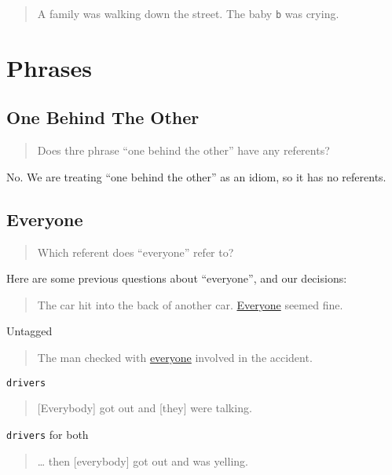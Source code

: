 \documentclass[
]{book}
\begin{document}
\begin{quote}
A family was walking down the street.
The baby \texttt{b} was crying.
\end{quote}

\hypertarget{phrases}{%
\section{Phrases}\label{phrases}}

\hypertarget{one-behind-the-other}{%
\subsection{One Behind The Other}\label{one-behind-the-other}}

\begin{quote}
Does thre phrase ``one behind the other'' have any referents?
\end{quote}

No.
We are treating ``one behind the other'' as an idiom, so it has no referents.

\hypertarget{everyone}{%
\subsection{Everyone}\label{everyone}}

\begin{quote}
Which referent does ``everyone'' refer to?
\end{quote}

Here are some previous questions about ``everyone'', and our decisions:

\begin{quote}
The car hit into the back of another car.
\protect\hyperlink{everyone}{Everyone} seemed fine.
\end{quote}

Untagged

\begin{quote}
The man checked with \protect\hyperlink{everyone}{everyone} involved in the accident.
\end{quote}

\texttt{drivers}

\begin{quote}
{[}Everybody{]} got out and {[}they{]} were talking.
\end{quote}

\texttt{drivers} for both

\begin{quote}
\ldots{} then {[}everybody{]} got out and was yelling.
\end{quote}
\end{document}
